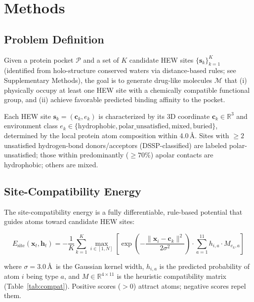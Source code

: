 \documentclass[11pt,letterpaper]{article}
\begin{document}
\section{Methods}

\subsection{Problem Definition}

Given a protein pocket $\mathcal{P}$ and a set of $K$ candidate HEW sites
$\{\mathbf{s}_k\}_{k=1}^K$ (identified from holo-structure conserved waters via
distance-based rules; see Supplementary Methods), the goal is to generate
drug-like molecules $\mathcal{M}$ that (i) physically occupy at least one HEW
site with a chemically compatible functional group, and (ii) achieve favorable
predicted binding affinity to the pocket.

Each HEW site $\mathbf{s}_k = (\mathbf{c}_k, e_k)$ is characterized by its 3D
coordinate $\mathbf{c}_k \in \mathbb{R}^3$ and environment class
$e_k \in \{\text{hydrophobic}, \text{polar\_unsatisfied}, \text{mixed},
\text{buried}\}$, determined by the local protein atom composition within
4.0\,\AA.  Sites with $\ge 2$ unsatisfied hydrogen-bond donors/acceptors
(DSSP-classified) are labeled polar-unsatisfied; those within predominantly
($\ge 70\%$) apolar contacts are hydrophobic; others are mixed.

\subsection{Site-Compatibility Energy}

The site-compatibility energy is a fully differentiable, rule-based potential
that guides atoms toward candidate HEW sites:

\begin{equation}\label{eq:site_energy}
E_{\text{site}}(\mathbf{x}_t, \mathbf{h}_t) =
  -\frac{1}{K} \sum_{k=1}^{K} \max_{i \in [1, N]}
  \left[
    \exp\left(-\frac{\|\mathbf{x}_i - \mathbf{c}_k\|^2}{2\sigma^2}\right)
    \cdot \sum_{a=1}^{11} h_{i,a} \cdot M_{e_k, a}
  \right]
\end{equation}

where $\sigma = 3.0$\,\AA\ is the Gaussian kernel width, $h_{i,a}$ is the
predicted probability of atom $i$ being type $a$, and $M \in \mathbb{R}^{4
\times 11}$ is the heuristic compatibility matrix (Table~\ref{tab:compat}).
Positive scores ($> 0$) attract atoms; negative scores repel them.
\end{document}
